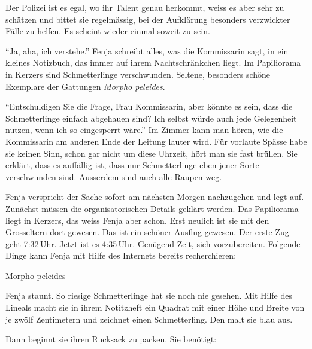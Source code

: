 Der Polizei ist es egal, wo ihr Talent genau herkommt, weiss es aber sehr zu schätzen und bittet sie regelmässig, bei der Aufklärung besonders verzwickter Fälle zu helfen. Es scheint wieder einmal soweit zu sein.

\enquote{Ja, aha, ich verstehe.} Fenja schreibt alles, was die Kommissarin sagt, in ein kleines Notizbuch, das immer auf ihrem Nachtschränkchen liegt. Im Papiliorama in Kerzers sind Schmetterlinge verschwunden. Seltene, besonders schöne Exemplare der Gattungen \emph{Morpho peleides}.

\enquote{Entschuldigen Sie die Frage, Frau Kommissarin, aber könnte es sein, dass die Schmetterlinge einfach abgehauen sind? Ich selbst würde auch jede Gelegenheit nutzen, wenn ich so eingesperrt wäre.} Im Zimmer kann man hören, wie die Kommissarin am anderen Ende der Leitung lauter wird. Für vorlaute Spässe habe sie keinen Sinn, schon gar nicht um diese Uhrzeit, hört man sie fast brüllen. Sie erklärt, dass es auffällig ist, dass nur Schmetterlinge eben jener Sorte verschwunden sind. Ausserdem sind auch alle Raupen weg.

Fenja verspricht der Sache sofort am nächsten Morgen nachzugehen und legt auf. Zunächst müssen die organisatorischen Details geklärt werden. Das Papiliorama liegt in Kerzers, das weiss Fenja aber schon. Erst neulich ist sie mit den Grosseltern dort gewesen. Das ist ein schöner Ausflug gewesen. Der erste Zug geht 7:32\,Uhr. Jetzt ist es 4:35\,Uhr. Genügend Zeit, sich vorzubereiten. Folgende Dinge kann Fenja mit Hilfe des Internets bereits recherchieren:

\begin{description}
	\item[Morpho peleides] 
\end{description}

Fenja staunt. So riesige Schmetterlinge hat sie noch nie gesehen. Mit Hilfe des Lineals macht sie in ihrem Notitzheft ein Quadrat mit einer Höhe und Breite von je zwölf Zentimetern und zeichnet einen Schmetterling. Den malt sie blau aus. 

Dann beginnt sie ihren Rucksack zu packen. Sie benötigt:

